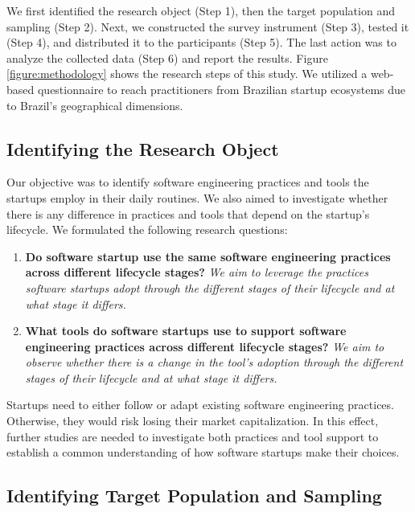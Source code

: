 \documentclass[runningheads]{llncs}
\begin{document}
We first identified the research object (Step 1), then the target population and sampling (Step 2). Next, we constructed the survey instrument (Step 3), tested it (Step 4), and distributed it to the participants (Step 5). The last action was to analyze the collected data (Step 6) and report the results. Figure \ref{figure:methodology} shows the research steps of this study. We utilized a web-based questionnaire to reach practitioners from Brazilian startup ecosystems due to Brazil's geographical dimensions.


\subsection{Identifying the Research Object} 
\label{subsection:questions}

Our objective was to identify software engineering practices and tools the startups employ in their daily routines. We also aimed to investigate whether there is any difference in practices and tools that depend on the startup's lifecycle. We formulated the following research questions:

\begin{enumerate}[label=\bf RQ\arabic*: ,leftmargin=1.4cm]
    \item \textbf{Do software startup use the same software engineering practices across different lifecycle stages?}
    \textit{We aim to leverage the practices software startups adopt through the different stages of their lifecycle and at what stage it differs.}
    \item \textbf{What tools do software startups use to support software engineering practices across different lifecycle stages?} 
    \textit{We aim to observe whether there is a change in the tool's adoption through the different stages of their lifecycle and at what stage it differs.}
\end{enumerate}

Startups need to either follow or adapt existing software engineering practices. Otherwise, they would risk losing their market capitalization. In this effect, further studies are needed to investigate both practices and tool support to establish a common understanding of how software startups make their choices.


\subsection{Identifying Target Population and Sampling}
\label{subsection:sampling}
\end{document}
